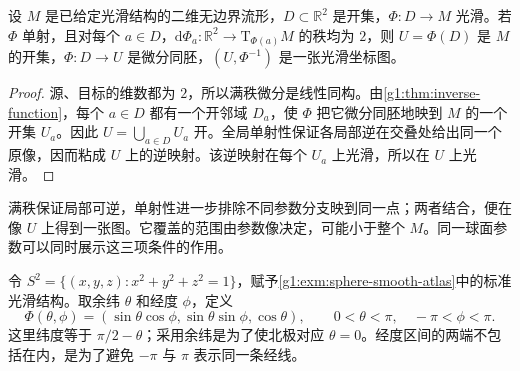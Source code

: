 \begin{proposition}
	\label{g1:prop:parameter-chart-test}
	设 \(M\) 是已给定光滑结构的二维无边界流形，\(D\subset\mathbb R^2\) 是开集，\(\Phi:D\rightarrow M\) 光滑。若 \(\Phi\) 单射，且对每个 \(a\in D\)，\(\mathrm{d}\Phi_a:\mathbb R^2\rightarrow\mathrm{T}_{\Phi(a)}M\) 的秩均为 \(2\)，则 \(U=\Phi(D)\) 是 \(M\) 的开集，\(\Phi:D\rightarrow U\) 是微分同胚，\((U,\Phi^{-1})\) 是一张光滑坐标图。
\end{proposition}
\begin{proof}
	源、目标的维数都为 \(2\)，所以满秩微分是线性同构。由\cref{g1:thm:inverse-function}，每个 \(a\in D\) 都有一个开邻域 \(D_a\)，使 \(\Phi\) 把它微分同胚地映到 \(M\) 的一个开集 \(U_a\)。因此 \(U=\bigcup_{a\in D}U_a\) 开。全局单射性保证各局部逆在交叠处给出同一个原像，因而粘成 \(U\) 上的逆映射。该逆映射在每个 \(U_a\) 上光滑，所以在 \(U\) 上光滑。
\end{proof}

满秩保证局部可逆，单射性进一步排除不同参数分支映到同一点；两者结合，便在像 \(U\) 上得到一张图。它覆盖的范围由参数像决定，可能小于整个 \(M\)。同一球面参数可以同时展示这三项条件的作用。

\ProseParagraphBreak

令 \(S^2=\{(x,y,z):x^2+y^2+z^2=1\}\)，赋予\cref{g1:exm:sphere-smooth-atlas}中的标准光滑结构。取余纬 \(\theta\) 和经度 \(\phi\)，定义
\begin{equation}
	\label{g1:eq:spherical-chart-parameters}
	\Phi(\theta,\phi)
	=(\sin\theta\cos\phi,\sin\theta\sin\phi,\cos\theta),
	\qquad 0<\theta<\pi,\quad-\pi<\phi<\pi.
\end{equation}
这里纬度等于 \(\pi/2-\theta\)；采用余纬是为了使北极对应 \(\theta=0\)。经度区间的两端不包括在内，是为了避免 \(-\pi\) 与 \(\pi\) 表示同一条经线。


